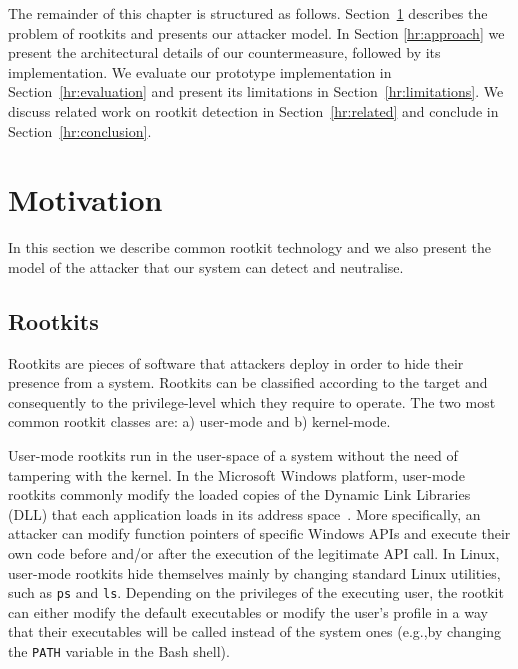 
The remainder of this chapter is structured as follows. Section~\ref{hr:motivation} describes the problem of rootkits and presents our attacker model. In Section \ref{hr:approach} we present the architectural details of our countermeasure, followed by its implementation.
We evaluate our prototype implementation in Section~\ref{hr:evaluation} and present its limitations in Section~\ref{hr:limitations}. We discuss related work on rootkit detection in Section~\ref{hr:related} and conclude in Section~\ref{hr:conclusion}.

\section{Motivation}\label{hr:motivation}
In this section we describe common rootkit technology and we also present the model of the attacker that our system can detect and neutralise.

\subsection{Rootkits}
Rootkits are pieces of software that attackers deploy in order to hide their presence from a system. Rootkits can be classified according to the target and consequently to the privilege-level which they require to operate. The two most common rootkit classes are: a) user-mode and b) kernel-mode.

User-mode rootkits run in the user-space of a system without the need of tampering with the kernel. In the Microsoft Windows platform, user-mode rootkits commonly modify the loaded copies of the Dynamic Link Libraries (DLL) that each application loads in its address space~\cite{SymantecRootkits}. 
More specifically, an attacker can modify function pointers of specific Windows APIs and execute their own code before and/or after the execution of the legitimate API call. In Linux, user-mode rootkits hide themselves mainly by changing standard Linux utilities, such as \texttt{ps} and \texttt{ls}. Depending on the privileges of the executing user, the rootkit can either modify the default executables or modify the user's profile in a way that their executables will be called instead of the system ones (e.g.,by changing the \texttt{PATH} variable in the Bash shell).

